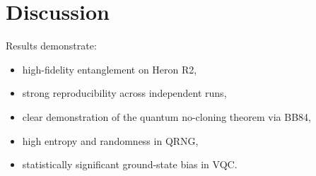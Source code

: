\section{Discussion}

Results demonstrate:
\begin{itemize}
    \item high-fidelity entanglement on Heron R2,
    \item strong reproducibility across independent runs,
    \item clear demonstration of the quantum no-cloning theorem via BB84,
    \item high entropy and randomness in QRNG,
    \item statistically significant ground-state bias in VQC.
\end{itemize}
